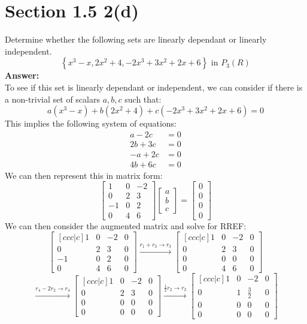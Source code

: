 \documentclass{article}
\begin{document}
\section*{Section 1.5  2(d)}
Determine whether the following sets are linearly dependant or linearly independent.
$$ \left\{x^3 - x, 2x^2 + 4, -2x^3 + 3x^2 + 2x+ 6   \right\} \text{ in } P_3(R)$$
\textbf{Answer:} \\
To see if this set is linearly dependant or independent, we can consider if there is a non-trivial set of scalars $a,b,c$ such that:
$$ a(x^3 - x) + b(2x^2 + 4) + c(-2x^3 + 3x^2 + 2x + 6) = 0$$
This implies the following system of equations:
\begin{align*}
    a - 2c &= 0\\
    2b + 3c &= 0\\
    -a + 2c &= 0\\
    4b + 6c &= 0
\end{align*}
We can then represent this in matrix form:  
$$ \begin{bmatrix}
    1 & 0 & -2 \\
    0 & 2 & 3 \\
    -1 & 0 & 2 \\
    0 & 4 & 6
\end{bmatrix} \begin{bmatrix}
    a \\ b \\ c
\end{bmatrix} = \begin{bmatrix}
    0 \\ 0 \\ 0 \\ 0
\end{bmatrix} $$
We can then consider the augmented matrix and solve for RREF:
$$ \begin{bmatrix}[ccc|c]
    1 & 0 & -2 & 0\\
    0 & 2 & 3 & 0\\
    -1 & 0 & 2 & 0\\
    0 & 4 & 6 & 0
\end{bmatrix} \xrightarrow{r_1 + r_3 \rightarrow r_3} \begin{bmatrix}[ccc|c]
    1 & 0 & -2 & 0\\
    0 & 2 & 3 & 0\\
    0 & 0 & 0 & 0\\
    0 & 4 & 6 & 0
\end{bmatrix}$$
$$ \xrightarrow{r_4 - 2r_2 \rightarrow r_4} \begin{bmatrix}[ccc|c]
    1 & 0 & -2 & 0\\
    0 & 2 & 3 & 0\\
    0 & 0 & 0 & 0\\
    0 & 0 & 0 & 0
\end{bmatrix} \xrightarrow{\frac{1}{2}r_2 \rightarrow r_2} \begin{bmatrix}[ccc|c]
    1 & 0 & -2 & 0\\
    0 & 1 & \frac{3}{2} & 0\\
    0 & 0 & 0 & 0\\
    0 & 0 & 0 & 0
\end{bmatrix}$$
\end{document}
